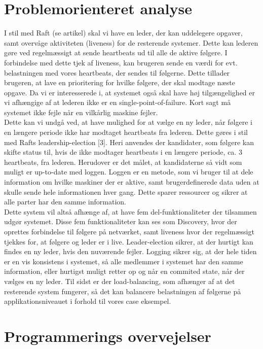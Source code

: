 \documentclass[a4paper,12pt]{article}
\begin{document}
\section{Problemorienteret analyse}
I stil med Raft (se artikel) skal vi have en leder, der kan uddelegere opgaver, samt overvåge aktiviteten (liveness) for de resterende systemer. Dette kan lederen gøre ved regelmæssigt at sende heartbeats ud til alle de aktive følgere. I forbindelse med dette tjek af liveness, kan brugeren sende en værdi for evt. belastningen med vores heartbeats, der sendes til følgerne. Dette tillader brugeren, at lave en prioritering for hvilke følgere, der skal modtage næste opgave.
Da vi er interesserede i, at systemet også skal have høj tilgængelighed er vi afhængige af at lederen ikke er en single-point-of-failure. Kort sagt må systemet ikke fejle når en vilkårlig maskine fejler.
\\
Dette kan vi undgå ved, at have mulighed for at vælge en ny leder, når følgere i en længere periode ikke har modtaget heartbeats fra lederen. Dette gøres i stil med Rafts leadership-election [3]. Heri anvendes der kandidater, som følgere kan skifte status til, hvis de ikke modtager heartbeats i en længere periode, ca. 3 heartbeats, fra lederen. Herudover er det målet, at kandidaterne så vidt som muligt er up-to-date med loggen. Loggen er en metode, som vi bruger til at dele information om hvilke maskiner der er aktive, samt brugerdefinerede data uden at skulle sende hele informationen hver gang. Dette sparer ressourcer og sikrer at alle parter har den samme information.
\\ 
Dette system vil altså afhænge af, at have fem del-funktionaliteter der tilsammen udgør systemet. Disse fem funktionaliteter kan ses som Discovery, hvor der oprettes forbindelse til følgere på netværket, samt liveness hvor der regelmæssigt tjekkes for, at følgere og leder er i live. Leader-election sikrer, at der hurtigt kan findes en ny leder, hvis den nuværende fejler. Logging sikrer sig, at der hele tiden er en vis konsistens i systemet, så alle medlemmer i systemet har den samme information, eller hurtigst muligt retter op og når en commited state, når der vælges en ny leder. Til sidst er der load-balancing, som afhænger af at det resterende system fungerer, så det kan balancere belastningen af følgerne på applikationsniveauet i forhold til vores case eksempel.
\\


\section{Programmerings overvejelser}
\end{document}
